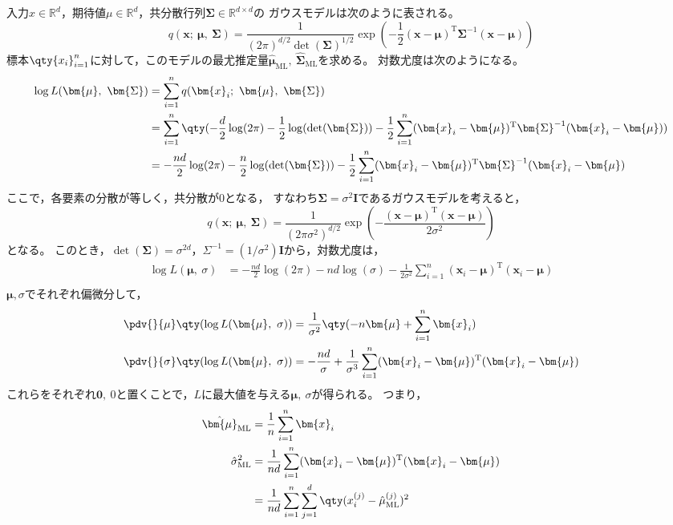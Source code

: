 \documentclass[class=jsarticle, crop=false, dvipdfmx, fleqn]{standalone}
\begin{document}
\section{}

入力\(x \in \mathbb{R}^d\)，期待値\(\mu \in \mathbb{R}^d\)，共分散行列\(\bm{\Sigma} \in \mathbb{R}^{d \times d}\)の
ガウスモデルは次のように表される。
\begin{equation}
	q(\bm{x};\ \bm{\mu},\ \bm{\Sigma}) = \frac{1}{(2\pi)^{d/2} \det (\bm{\Sigma})^{1/2}} \exp(- \frac{1}{2} (\bm{x} - \bm{\mu})^\mathrm{T} \bm{\Sigma}^{-1} (\bm{x} - \bm{\mu}))
\end{equation}
標本\(\qty{x_i}_{i=1}^{n}\)に対して，このモデルの最尤推定量\(\hat{\bm{\mu}}_\mathrm{ML},\ \hat{\bm{\Sigma}}_\mathrm{ML}\)を求める。
対数尤度は次のようになる。
\begin{align}
	\log L(\bm{\mu},\ \bm{\Sigma})
	& = \sum_{i=1}^{n} q(\bm{x}_i;\ \bm{\mu},\ \bm{\Sigma}) \\
	& = \sum_{i=1}^{n} \qty(-\frac{d}{2} \log(2\pi) -\frac{1}{2} \log(\det(\bm{\Sigma})) - \frac{1}{2} \sum_{i=1}^{n} (\bm{x}_i - \bm{\mu})^\mathrm{T} \bm{\Sigma}^{-1} (\bm{x}_i - \bm{\mu})) \\
	& = -\frac{nd}{2} \log(2\pi) - \frac{n}{2} \log(\det(\bm{\Sigma})) - \frac{1}{2} \sum_{i=1}^{n} (\bm{x}_i - \bm{\mu})^\mathrm{T} \bm{\Sigma}^{-1} (\bm{x}_i - \bm{\mu}) \\
\end{align}
ここで，各要素の分散が等しく，共分散が0となる，
すなわち\(\bm{\Sigma} = {\sigma}^2 \bm{I}\)であるガウスモデルを考えると，
\begin{equation}
	q(\bm{x};\ \bm{\mu},\ \bm{\Sigma}) = \frac{1}{(2 \pi {\sigma}^2)^{d/2}} \exp(- \frac{(\bm{x} - \bm{\mu})^\mathrm{T} (\bm{x} - \bm{\mu})}{2 {\sigma}^2})
\end{equation}
となる。
このとき，\(\det(\bm{\Sigma}) = {\sigma}^{2d}\)，\(\Sigma^{-1} = (1/{\sigma}^2) \bm{I}\)から，対数尤度は，
\begin{align}
	\log L(\bm{\mu},\ \sigma)
	& = -\frac{nd}{2} \log(2\pi) - nd \log(\sigma) - \frac{1}{2 {\sigma}^2} \sum_{i=1}^{n} (\bm{x}_i - \bm{\mu})^\mathrm{T} (\bm{x}_i - \bm{\mu}) \\
\end{align}
\(\bm{\mu}, \sigma\)でそれぞれ偏微分して，
\begin{align}
	& \pdv{}{\mu} \qty(\log L(\bm{\mu},\ \sigma)) = \frac{1}{{\sigma}^2} \qty(-n \bm{\mu} + \sum_{i=1}^{n} \bm{x}_i) \\
	& \pdv{}{\sigma} \qty(\log L(\bm{\mu},\ \sigma)) = -\frac{nd}{\sigma} + \frac{1}{{\sigma}^3} \sum_{i=1}^{n} (\bm{x}_i - \bm{\mu})^\mathrm{T} (\bm{x}_i - \bm{\mu})
\end{align}
これらをそれぞれ\(\bm{0},\ 0\)と置くことで，\(L\)に最大値を与える\(\bm{\mu},\ \sigma\)が得られる。
つまり，
\begin{align}
	\hat{\bm{\mu}}_\mathrm{ML} & = \frac{1}{n} \sum_{i=1}^{n} \bm{x}_i \\
	{\hat{\sigma}_\mathrm{ML}}^2 
		& = \frac{1}{nd} \sum_{i=1}^{n} (\bm{x}_i - \bm{\mu})^\mathrm{T} (\bm{x}_i - \bm{\mu}) \\
		& = \frac{1}{nd} \sum_{i=1}^{n} \sum_{j=1}^{d} \qty(x_i^{(j)} - {\hat{\mu}_\mathrm{ML}}^{(j)})^2
\end{align}
\end{document}
